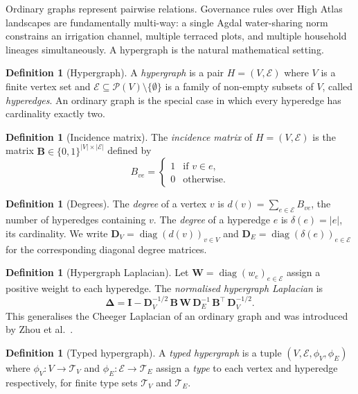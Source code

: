 \documentclass[11pt,a4paper]{article}
\theoremstyle{plain}
\theoremstyle{definition}
\newtheorem{definition}[theorem]{Definition}
\theoremstyle{remark}
\newcommand{\diag}{\operatorname{diag}}
\newcommand{\Tv}{\mathcal{T}_V}
\newcommand{\Te}{\mathcal{T}_E}
\begin{document}
Ordinary graphs represent pairwise relations. Governance rules over
High Atlas landscapes are fundamentally multi-way: a single Agdal
water-sharing norm constrains an irrigation channel, multiple terraced
plots, and multiple household lineages simultaneously. A hypergraph
is the natural mathematical setting.

\begin{definition}[Hypergraph]
\label{def:hypergraph}
A \emph{hypergraph} is a pair $H = (V, \mathcal{E})$ where $V$ is a
finite vertex set and $\mathcal{E} \subseteq \mathcal{P}(V) \setminus
\{\emptyset\}$ is a family of non-empty subsets of $V$, called
\emph{hyperedges}. An ordinary graph is the special case in which
every hyperedge has cardinality exactly two.
\end{definition}

\begin{definition}[Incidence matrix]
\label{def:incidence}
The \emph{incidence matrix} of $H = (V, \mathcal{E})$ is the matrix
$\mathbf{B} \in \{0,1\}^{|V| \times |\mathcal{E}|}$ defined by
\[
  B_{ve} = \begin{cases} 1 & \text{if } v \in e, \\ 0 & \text{otherwise.} \end{cases}
\]
\end{definition}

\begin{definition}[Degrees]
The \emph{degree} of a vertex $v$ is
$d(v) = \sum_{e \in \mathcal{E}} B_{ve}$,
the number of hyperedges containing $v$.
The \emph{degree} of a hyperedge $e$ is $\delta(e) = |e|$, its
cardinality. We write $\mathbf{D}_V = \diag(d(v))_{v \in V}$ and
$\mathbf{D}_E = \diag(\delta(e))_{e \in \mathcal{E}}$ for the
corresponding diagonal degree matrices.
\end{definition}

\begin{definition}[Hypergraph Laplacian]
\label{def:laplacian}
Let $\mathbf{W} = \diag(w_e)_{e \in \mathcal{E}}$ assign a positive
weight to each hyperedge. The \emph{normalised hypergraph Laplacian}
is
\[
  \boldsymbol{\Delta} = \mathbf{I}
  - \mathbf{D}_V^{-1/2}\,\mathbf{B}\,\mathbf{W}\,
    \mathbf{D}_E^{-1}\,\mathbf{B}^\top\,\mathbf{D}_V^{-1/2}.
\]
This generalises the Cheeger Laplacian of an ordinary graph and
was introduced by Zhou et al.~\cite{zhou2006learning}.
\end{definition}

\begin{definition}[Typed hypergraph]
\label{def:typed_hypergraph}
A \emph{typed hypergraph} is a tuple
$(V, \mathcal{E}, \phi_V, \phi_E)$ where
$\phi_V : V \to \Tv$ and $\phi_E : \mathcal{E} \to \Te$
assign a \emph{type} to each vertex and hyperedge respectively,
for finite type sets $\Tv$ and $\Te$.
\end{definition}
\end{document}
